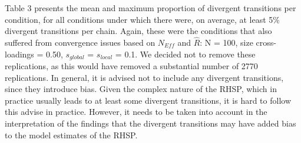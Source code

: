 \documentclass[
  man, donotrepeattitle,floatsintext]{apa6}
\begin{document}
Table 3 presents the mean and maximum proportion of divergent transitions per condition, for all conditions under which there were, on average, at least 5\% divergent transitions per chain. Again, these were the conditions that also suffered from convergence issues based on \(N_{Eff}\) and \(\hat{R}\): N = 100, size cross-loadings = 0.50, \(s_{global}\) = \(s_{local}\) = 0.1. We decided not to remove these replications, as this would have removed a substantial number of 2770 replications. In general, it is advised not to include any divergent transitions, since they introduce bias. Given the complex nature of the RHSP, which in practice usually leads to at least some divergent transitions, it is hard to follow this advise in practice. However, it needs to be taken into account in the interpretation of the findings that the divergent transitions may have added bias to the model estimates of the RHSP.
\end{document}

